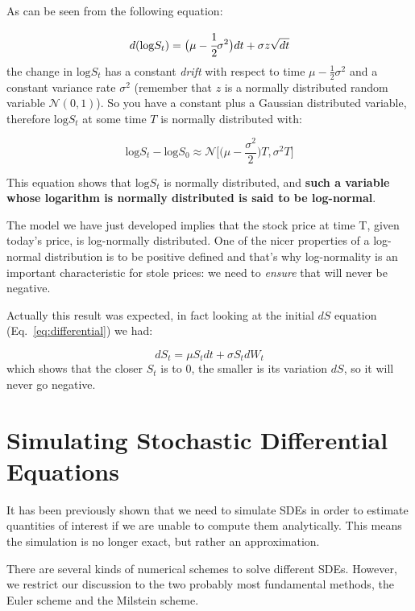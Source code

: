 As can be seen from the following equation:

\begin{equation}
d(\textrm{log} S_t) = \big(\mu - \cfrac{1}{2}\sigma^2\big)dt + \sigma z\sqrt{dt}
\end{equation}
the change in \(\textrm{log} S_t\) has a constant \emph{drift} with respect to time \(\mu - \frac{1}{2}\sigma^2\) and a constant variance rate \(\sigma^2\)
(remember that \(z\) is a normally distributed random variable
\(\mathcal{N}(0,1)\)). So you have a constant plus a Gaussian
distributed variable, therefore \(\textrm{log} S_t\) at some time \(T\)
is normally distributed with:

\begin{equation}
\textrm{log}S_t - \textrm{log}S_0 \approx\mathcal{N}\big[\big(\mu-\frac{\sigma^2}{2}\big)T, \sigma^2 T\big]
\end{equation}

This equation shows that \(\textrm{log}S_t\) is normally distributed,
and \textbf{such a variable whose logarithm is normally distributed is said
to be log-normal}. 

The model we have just developed implies that
the stock price at time T, given today's price, is log-normally
distributed. One of the nicer properties of a log-normal distribution is to be positive defined and that's why log-normality is an important characteristic for stole prices: we need to \emph{ensure} that will never be negative. 

Actually this result was expected, in fact looking at the initial \(dS\) equation (Eq.~\ref{eq:differential}) we had:

\begin{equation}
dS_t = \mu S_tdt + \sigma S_t dW_t
\end{equation}
which shows that the closer \(S_t\) is to 0, the smaller is its variation \(dS\), so it will never go negative.


\section {Simulating Stochastic Differential Equations}
It has been previously shown that we need to simulate SDEs in order to estimate 
quantities of interest if we are unable to compute them analytically. 
This means the simulation is no longer exact, but rather an approximation.

There are several kinds of numerical schemes to solve different SDEs. 
However, we restrict our discussion to the two probably most fundamental methods, 
the Euler scheme and the Milstein scheme. 

